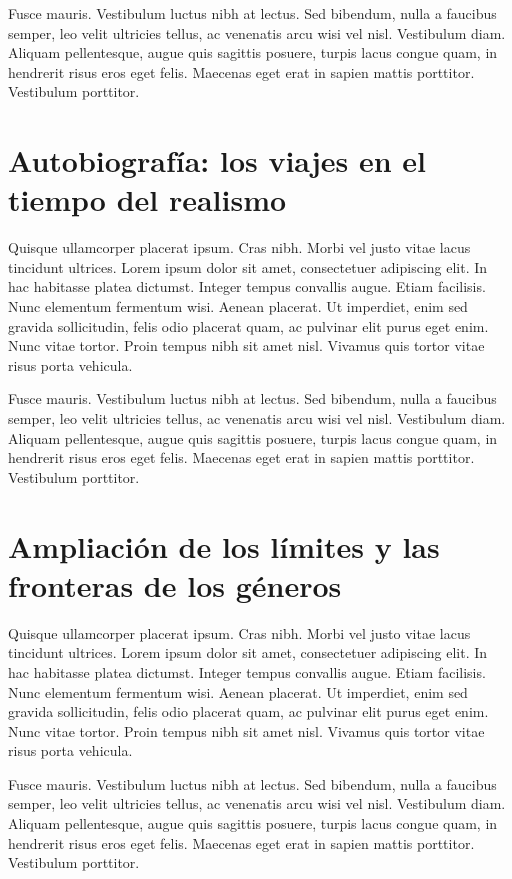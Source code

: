 Fusce mauris. Vestibulum luctus nibh at lectus. Sed bibendum, nulla a faucibus semper, leo velit ultricies tellus, ac venenatis arcu wisi vel nisl. Vestibulum diam. Aliquam pellentesque, augue quis sagittis posuere, turpis lacus congue quam, in hendrerit risus eros eget felis. Maecenas eget erat in sapien mattis porttitor. Vestibulum porttitor.

\section{Autobiografía: los viajes en el tiempo del realismo}

Quisque ullamcorper placerat ipsum. Cras nibh. Morbi vel justo vitae lacus tincidunt ultrices. Lorem ipsum dolor sit amet, consectetuer adipiscing elit. In hac habitasse platea dictumst. Integer tempus convallis augue. Etiam facilisis. Nunc elementum fermentum wisi. Aenean placerat. Ut imperdiet, enim sed gravida sollicitudin, felis odio placerat quam, ac pulvinar elit purus eget enim. Nunc vitae tortor. Proin tempus nibh sit amet nisl. Vivamus quis tortor vitae risus porta vehicula.

Fusce mauris. Vestibulum luctus nibh at lectus. Sed bibendum, nulla a faucibus semper, leo velit ultricies tellus, ac venenatis arcu wisi vel nisl. Vestibulum diam. Aliquam pellentesque, augue quis sagittis posuere, turpis lacus congue quam, in hendrerit risus eros eget felis. Maecenas eget erat in sapien mattis porttitor. Vestibulum porttitor.

\section{Ampliación de los límites y las fronteras de los géneros}

Quisque ullamcorper placerat ipsum. Cras nibh. Morbi vel justo vitae lacus tincidunt ultrices. Lorem ipsum dolor sit amet, consectetuer adipiscing elit. In hac habitasse platea dictumst. Integer tempus convallis augue. Etiam facilisis. Nunc elementum fermentum wisi. Aenean placerat. Ut imperdiet, enim sed gravida sollicitudin, felis odio placerat quam, ac pulvinar elit purus eget enim. Nunc vitae tortor. Proin tempus nibh sit amet nisl. Vivamus quis tortor vitae risus porta vehicula.

Fusce mauris. Vestibulum luctus nibh at lectus. Sed bibendum, nulla a faucibus semper, leo velit ultricies tellus, ac venenatis arcu wisi vel nisl. Vestibulum diam. Aliquam pellentesque, augue quis sagittis posuere, turpis lacus congue quam, in hendrerit risus eros eget felis. Maecenas eget erat in sapien mattis porttitor. Vestibulum porttitor.

